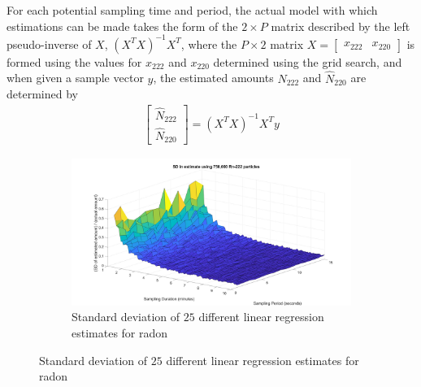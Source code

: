 \documentclass[11pt]{m2pi}
\begin{document}
For each potential sampling time and period, the actual model with which estimations can be made takes the form of the $2\times P$ matrix described by the left pseudo-inverse of $X$, $(X^TX)^{-1}X^T$, where the $P\times 2$ matrix $X=\begin{bmatrix} {x_{222}} & {x_{220}}\end{bmatrix}$ is formed using the values for ${x_{222}}$ and ${x_{220}}$ determined using the grid search, and when given a sample vector $y$, the estimated amounts $\hat{N}_{222}$ and $\hat{N}_{220}$ are determined by
\begin{align*}
    \begin{bmatrix}
    \hat{N}_{222}\\
    \hat{N}_{220}
    \end{bmatrix} = (X^TX)^{-1}X^T y
\end{align*}
\begin{figure}[h]
\centering
        \begin{subfigure}[c]{\textwidth}
            \includegraphics[scale=0.14]{images/std_rn222_gridsearch.jpg}
            \caption[Network2]%
            {{\tiny Standard deviation of $25$ different linear regression estimates for radon}}    
            \label{fig:RadonGridsearch}
        \end{subfigure}
        
\end{figure}
\end{document}
